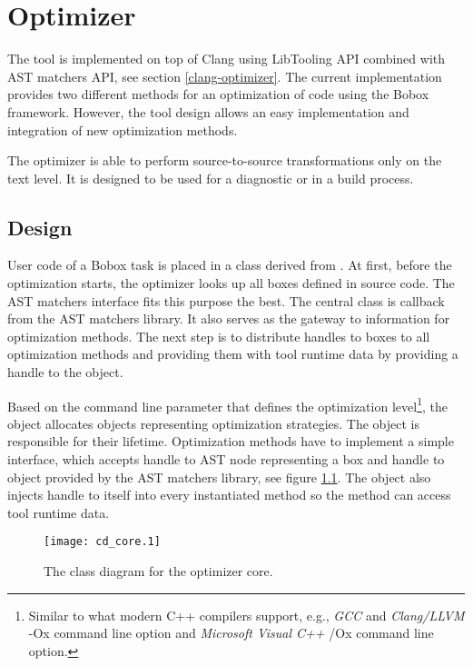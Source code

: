 \chapter{Optimizer}
The tool is implemented on top of Clang using LibTooling API combined with AST matchers API, see section \ref{clang-optimizer}. The current implementation provides two different methods for an optimization of code using the Bobox framework. However, the tool design allows an easy implementation and integration of new optimization methods.

The optimizer is able to perform source-to-source transformations only on the text level. It is designed to be used for a diagnostic or in a build process.

\section{Design}
User code of a Bobox task is placed in a class derived from . At first, before the optimization starts, the optimizer looks up all boxes defined in source code. The AST matchers interface fits this purpose the best. The central  class is callback from the AST matchers library. It also serves as the gateway to information for optimization methods. The next step is to distribute handles to boxes to all optimization methods and providing them with tool runtime data by providing a handle to the  object.

Based on the command line parameter that defines the optimization level\footnote{Similar to what modern C++ compilers support, e.g., \emph{GCC} and \emph{Clang/LLVM} -Ox command line option and \emph{Microsoft Visual C++} /Ox command line option.}, the  object allocates objects representing optimization strategies. The object is responsible for their lifetime. Optimization methods have to implement a simple interface, which accepts handle to  AST node representing a box and handle to  object provided by the AST matchers library, see figure \ref{class-optimizer}. The  object also injects handle to itself into every instantiated method so the method can access tool runtime data.

\begin{figure}[h!]
\caption{The class diagram for the optimizer core.}
\label{class-optimizer}
\vspace{0.5cm}
\centering
\texttt{[image: cd\_core.1]}
\end{figure}

